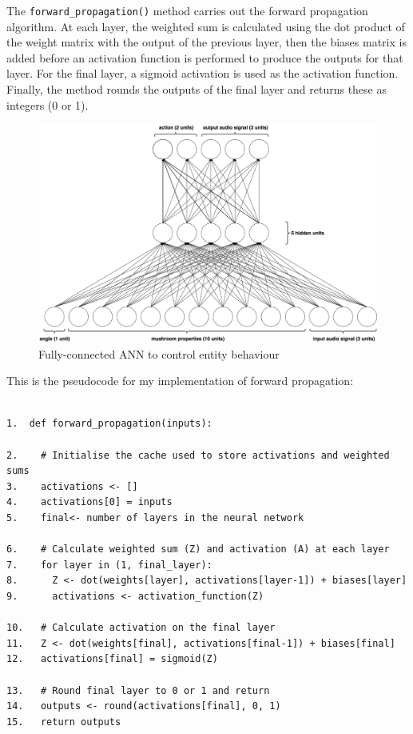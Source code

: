 \documentclass[12pt,a4paper,twoside,openright]{report}
\begin{document}
The \texttt{forward\_propagation()} method carries out the forward propagation algorithm. At each layer, the weighted sum is calculated using the dot product of the weight matrix with the output of the previous layer, then the biases matrix is added before an activation function is performed to produce the outputs for that layer. For the final layer, a sigmoid activation is used as the activation function. Finally, the method rounds the outputs of the final layer and returns these as integers (0 or 1).

\begin{figure}[ht]
  \centering
  \includegraphics[width=.9\linewidth]{figs/fullneural}
  \caption{Fully-connected ANN to control entity behaviour}
  \label{fig:fullneural}
\end{figure}

\newpage 

This is the pseudocode for my implementation of forward propagation: 

\begin{verbatim}

1.  def forward_propagation(inputs):

2.    # Initialise the cache used to store activations and weighted sums
3.    activations <- []
4.    activations[0] = inputs
5.    final<- number of layers in the neural network

6.    # Calculate weighted sum (Z) and activation (A) at each layer
7.    for layer in (1, final_layer):
8.      Z <- dot(weights[layer], activations[layer-1]) + biases[layer]
9.      activations <- activation_function(Z)

10.   # Calculate activation on the final layer
11.   Z <- dot(weights[final], activations[final-1]) + biases[final]
12.   activations[final] = sigmoid(Z)

13.   # Round final layer to 0 or 1 and return
14.   outputs <- round(activations[final], 0, 1)
15.   return outputs

\end{verbatim}
\end{document}
